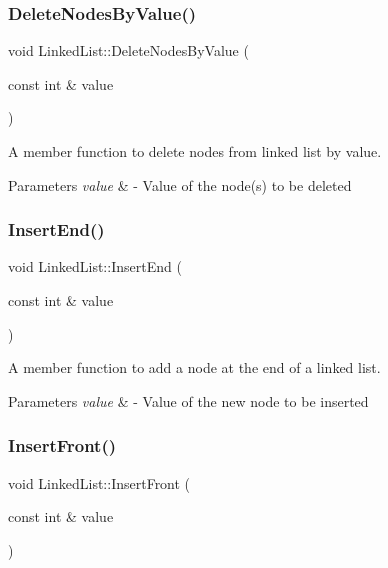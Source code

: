 \subsubsection{\texorpdfstring{Delete\+Nodes\+By\+Value()}{DeleteNodesByValue()}}
{\footnotesize\ttfamily void Linked\+List\+::\+Delete\+Nodes\+By\+Value (\begin{DoxyParamCaption}\item[{const int \&}]{value }\end{DoxyParamCaption})}



A member function to delete nodes from linked list by value. 


\begin{DoxyParams}{Parameters}
{\em value} & -\/ Value of the node(s) to be deleted \\
\hline
\end{DoxyParams}
\mbox{\label{classLinkedList_a4e97c2797b1bf8d9e8bbd800af2ddbd9}} 
\subsubsection{\texorpdfstring{Insert\+End()}{InsertEnd()}}
{\footnotesize\ttfamily void Linked\+List\+::\+Insert\+End (\begin{DoxyParamCaption}\item[{const int \&}]{value }\end{DoxyParamCaption})}



A member function to add a node at the end of a linked list. 


\begin{DoxyParams}{Parameters}
{\em value} & -\/ Value of the new node to be inserted \\
\hline
\end{DoxyParams}
\mbox{\label{classLinkedList_a37f55fb8cfe1af658a49670c9674c1b1}} 
\subsubsection{\texorpdfstring{Insert\+Front()}{InsertFront()}}
{\footnotesize\ttfamily void Linked\+List\+::\+Insert\+Front (\begin{DoxyParamCaption}\item[{const int \&}]{value }\end{DoxyParamCaption})}



